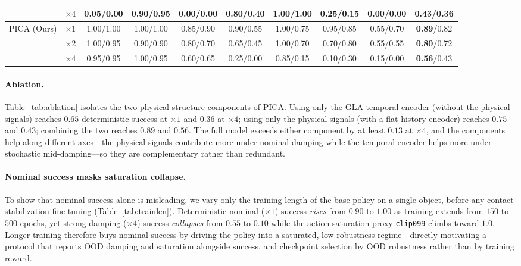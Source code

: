 \documentclass{article}
\begin{document}
\begin{table}[t]
{\begin{tabular}{llcccccccc}
 & $\times4$ & 0.05/0.00 & 0.90/0.95 & 0.00/0.00 & 0.80/0.40 & 1.00/1.00 & 0.25/0.15 & 0.00/0.00 & 0.43/0.36 \\
\midrule
\multirow{3}{*}{PICA (Ours)} & $\times1$ & 1.00/1.00 & 1.00/1.00 & 0.85/0.90 & 0.90/0.55 & 1.00/0.75 & 0.95/0.85 & 0.55/0.70 & \textbf{0.89}/0.82 \\
 & $\times2$ & 1.00/0.95 & 0.90/0.90 & 0.80/0.70 & 0.65/0.45 & 1.00/0.70 & 0.70/0.80 & 0.55/0.55 & \textbf{0.80}/0.72 \\
 & $\times4$ & 0.95/0.95 & 1.00/0.95 & 0.60/0.65 & 0.25/0.00 & 0.85/0.15 & 0.10/0.30 & 0.15/0.00 & \textbf{0.56}/0.43 \\
\bottomrule
\end{tabular}}
\end{table}



\paragraph{Ablation.}
Table~\ref{tab:ablation} isolates the two physical-structure
components of PICA. Using only the GLA temporal encoder (without the
physical signals) reaches $0.65$ deterministic success at $\times1$
and $0.36$ at $\times4$; using only the physical signals (with a
flat-history encoder) reaches $0.75$ and $0.43$; combining the two
reaches $0.89$ and $0.56$. The full model exceeds either component by
at least $0.13$ at $\times4$, and the components help along different
axes---the physical signals contribute more under nominal damping
while the temporal encoder helps more under stochastic
mid-damping---so they are complementary rather than redundant.

\paragraph{Nominal success masks saturation collapse.}
To show that nominal success alone is misleading, we vary only the
training length of the base policy on a single object, before any
contact-stabilization fine-tuning (Table~\ref{tab:trainlen}).
Deterministic nominal ($\times1$) success \emph{rises} from $0.90$ to
$1.00$ as training extends from $150$ to $500$ epochs, yet
strong-damping ($\times4$) success \emph{collapses} from $0.55$ to
$0.10$ while the action-saturation proxy \texttt{clip099} climbs toward
$1.0$. Longer training therefore buys nominal success by driving the
policy into a saturated, low-robustness regime---directly motivating a
protocol that reports OOD damping and saturation alongside success, and
checkpoint selection by OOD robustness rather than by training reward.
\end{document}
